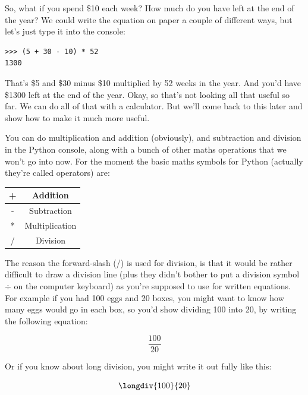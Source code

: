 So, what if you spend \$10 each week?  How much do you have left at the end of the year?  We could write the equation on paper a couple of different ways, but let's just type it into the console:

\begin{listing}
\begin{verbatim}
>>> (5 + 30 - 10) * 52
1300
\end{verbatim}
\end{listing}

That's \$5 and \$30 minus \$10 multiplied by 52 weeks in the year.  And you'd have \$1300 left at the end of the year. Okay, so that's not looking all that useful so far.  We can do all of that with a calculator.  But we'll come back to this later and show how to make it much more useful.

You can do multiplication and addition (obviously), and subtraction and division in the Python console, along with a bunch of other maths operations that we won't go into now.  For the moment the basic maths symbols for Python (actually they're called operators) are:

\begin{center}
\begin{tabular}{|c|c|}
\hline
+ & Addition \\
\hline
- & Subtraction \\
\hline
* & Multiplication \\
\hline
/ & Division \\
\hline
\end{tabular}
\end{center}

The reason the forward-slash (/) is used for division, is that it would be rather difficult to draw a division line (plus they didn't bother to put a division symbol $\div$ on the computer keyboard) as you're supposed to use for written equations.  For example if you had 100 eggs and 20 boxes, you might want to know how many eggs would go in each box, so you'd show dividing 100 into 20, by writing the following equation:

\begin{displaymath}
\frac{100}{20}
\end{displaymath}

Or if you know about long division, you might write it out fully like this:

\begin{displaymath}
\longdiv{100}{20}
\end{displaymath}

